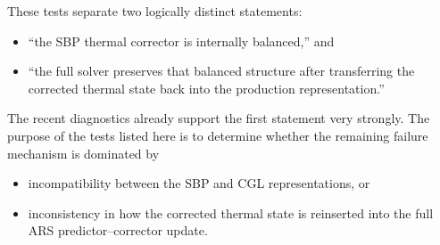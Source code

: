 \documentclass[11pt]{article}
\begin{document}
These tests separate two logically distinct statements:

\begin{itemize}
\item ``the SBP thermal corrector is internally balanced,'' and
\item ``the full solver preserves that balanced structure after transferring
the corrected thermal state back into the production representation.''
\end{itemize}

The recent diagnostics already support the first statement very strongly. The
purpose of the tests listed here is to determine whether the remaining failure
mechanism is dominated by

\begin{itemize}
\item incompatibility between the SBP and CGL representations, or
\item inconsistency in how the corrected thermal state is reinserted into the
full ARS predictor--corrector update.
\end{itemize}
\end{document}
